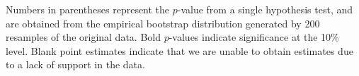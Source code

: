 \begin{table}[H]
\begin{threeparttable}
\begin{tablenotes}
Numbers in parentheses represent the $p$-value from a single hypothesis test, and are obtained from 
the empirical bootstrap distribution generated by 200 resamples of the original data. 
Bold $p$-values indicate significance at the 10\% level.
Blank point estimates indicate that we are unable to obtain estimates due to a lack of support in the data. 

    \end{tablenotes}
  \end{threeparttable}

\end{table}